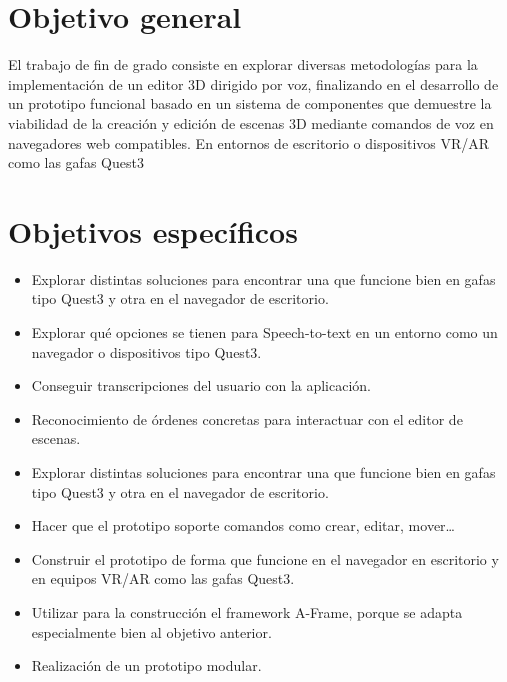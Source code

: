 \documentclass[a4paper, 12pt]{book}
\begin{document}
\section{Objetivo general} %
\label{sec:objetivo-general} %

El trabajo de fin de grado consiste en explorar diversas metodologías para la implementación de un editor 3D dirigido por voz, 
finalizando en el desarrollo de un prototipo funcional basado en un sistema de componentes que demuestre la viabilidad de la creación y edición de escenas 3D mediante comandos de voz en navegadores web compatibles.
En entornos de escritorio o dispositivos VR/AR como las gafas Quest3

\section{Objetivos específicos}
\label{sec:objetivos-especificos}

\begin{itemize}
\item Explorar distintas soluciones para encontrar una que funcione bien en gafas tipo Quest3 y otra en el navegador de escritorio.
\item Explorar qué opciones se tienen para Speech-to-text en un entorno como un navegador o dispositivos tipo Quest3.
\item Conseguir transcripciones del usuario con la aplicación.
\item Reconocimiento de órdenes concretas para interactuar con el editor de escenas.
\item Explorar distintas soluciones para encontrar una que funcione bien en gafas tipo Quest3 y otra en el navegador de escritorio.
\item Hacer que el prototipo soporte comandos como crear, editar, mover\dots
\item Construir el prototipo de forma que funcione en el navegador en escritorio y en equipos VR/AR como las gafas Quest3.
\item Utilizar para la construcción el framework A-Frame, porque se adapta especialmente bien al objetivo anterior. 
\item Realización de un prototipo modular.
\end{itemize}
\end{document}
